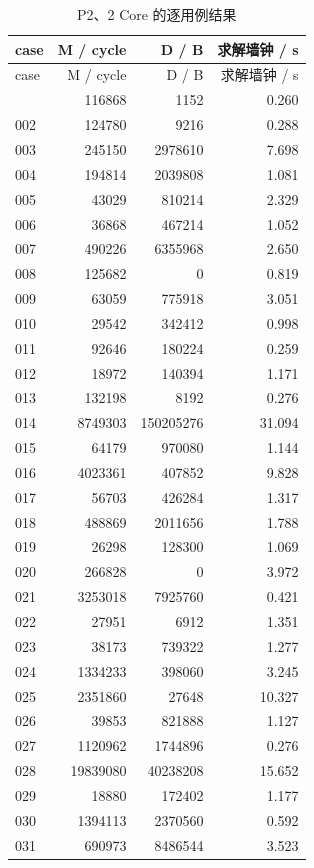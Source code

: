 \documentclass[anonymous,notoc]{gmcm2026}
\begin{document}
\begin{longtable}{lrrr}
\caption{P2、2 Core 的逐用例结果}\\
\toprule
case & M / cycle & D / B & 求解墙钟 / s\\\midrule
\endfirsthead
\toprule
case & M / cycle & D / B & 求解墙钟 / s\\\midrule
\endhead
\bottomrule\endfoot
001 & 116868 & 1152 & 0.260 \\
002 & 124780 & 9216 & 0.288 \\
003 & 245150 & 2978610 & 7.698 \\
004 & 194814 & 2039808 & 1.081 \\
005 & 43029 & 810214 & 2.329 \\
006 & 36868 & 467214 & 1.052 \\
007 & 490226 & 6355968 & 2.650 \\
008 & 125682 & 0 & 0.819 \\
009 & 63059 & 775918 & 3.051 \\
010 & 29542 & 342412 & 0.998 \\
011 & 92646 & 180224 & 0.259 \\
012 & 18972 & 140394 & 1.171 \\
013 & 132198 & 8192 & 0.276 \\
014 & 8749303 & 150205276 & 31.094 \\
015 & 64179 & 970080 & 1.144 \\
016 & 4023361 & 407852 & 9.828 \\
017 & 56703 & 426284 & 1.317 \\
018 & 488869 & 2011656 & 1.788 \\
019 & 26298 & 128300 & 1.069 \\
020 & 266828 & 0 & 3.972 \\
021 & 3253018 & 7925760 & 0.421 \\
022 & 27951 & 6912 & 1.351 \\
023 & 38173 & 739322 & 1.277 \\
024 & 1334233 & 398060 & 3.245 \\
025 & 2351860 & 27648 & 10.327 \\
026 & 39853 & 821888 & 1.127 \\
027 & 1120962 & 1744896 & 0.276 \\
028 & 19839080 & 40238208 & 15.652 \\
029 & 18880 & 172402 & 1.177 \\
030 & 1394113 & 2370560 & 0.592 \\
031 & 690973 & 8486544 & 3.523 \\

\end{longtable}
\end{document}
